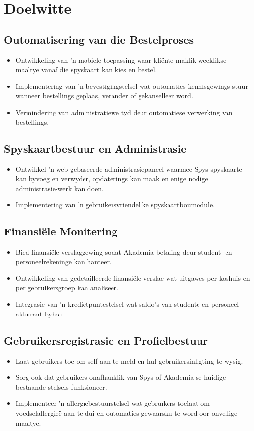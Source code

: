 \section{Doelwitte}

\subsection{Outomatisering van die Bestelproses}
\begin{itemize}
  \item Ontwikkeling van 'n mobiele toepassing waar kliënte maklik weeklikse maaltye vanaf die spyskaart kan kies en bestel.
  \item Implementering van 'n bevestigingstelsel wat outomaties kennisgewings stuur wanneer bestellings geplaas, verander of gekanselleer word.
  \item Vermindering van administratiewe tyd deur outomatiese verwerking van bestellings.
\end{itemize}

\subsection{Spyskaartbestuur en Administrasie}
\begin{itemize}
  \item Ontwikkel 'n web gebaseerde administrasiepaneel waarmee Spys spyskaarte kan byvoeg en verwyder, opdaterings kan maak en enige nodige administrasie-werk kan doen.
  \item Implementering van 'n gebruikersvriendelike spyskaartboumodule.
\end{itemize}

\subsection{Finansiële Monitering}
\begin{itemize}
  \item Bied finansiële verslaggewing sodat Akademia betaling deur student- en personeelrekeninge kan hanteer.
  \item Ontwikkeling van gedetailleerde finansiële verslae wat uitgawes per koshuis en per gebruikersgroep kan analiseer.
  \item Integrasie van 'n kredietpuntestelsel wat saldo's van studente en personeel akkuraat byhou.
\end{itemize}

\subsection{Gebruikersregistrasie en Profielbestuur}
\begin{itemize}
  \item Laat gebruikers toe om self aan te meld en hul gebruikersinligting te wysig.
  \item Sorg ook dat gebruikers onafhanklik van Spys of Akademia se huidige bestaande stelsels funksioneer.
  \item Implementeer 'n allergiebestuurstelsel wat gebruikers toelaat om voedselallergieë aan te dui en outomaties gewaarsku te word oor onveilige maaltye.
\end{itemize}

